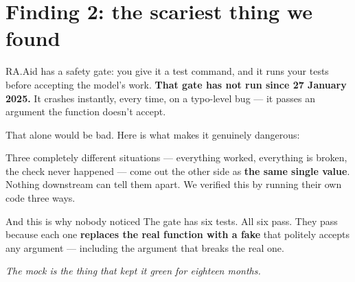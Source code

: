 \documentclass[11pt]{article}
\newcommand{\code}[1]{{\small\texttt{#1}}}
\newcommand{\shout}[1]{\textbf{#1}}
\begin{document}
\newpage
\section{Finding 2: the scariest thing we found}

RA.Aid has a safety gate: you give it a test command, and it runs your tests
before accepting the model's work. \shout{That gate has not run since 27 January
2025.} It crashes instantly, every time, on a typo-level bug --- it passes an
argument the function doesn't accept.

That alone would be bad. Here is what makes it genuinely dangerous:

\begin{center}
\end{center}

Three completely different situations --- everything worked, everything is broken,
the check never happened --- come out the other side as \shout{the same single
value}. Nothing downstream can tell them apart. We verified this by running their
own code three ways.

\begin{badbox}{And this is why nobody noticed}
The gate has six tests. All six pass. They pass because each one
\shout{replaces the real function with a fake} that politely accepts any
argument --- including the argument that breaks the real one.

\medskip
\emph{The mock is the thing that kept it green for eighteen months.}
\end{badbox}
\end{document}

